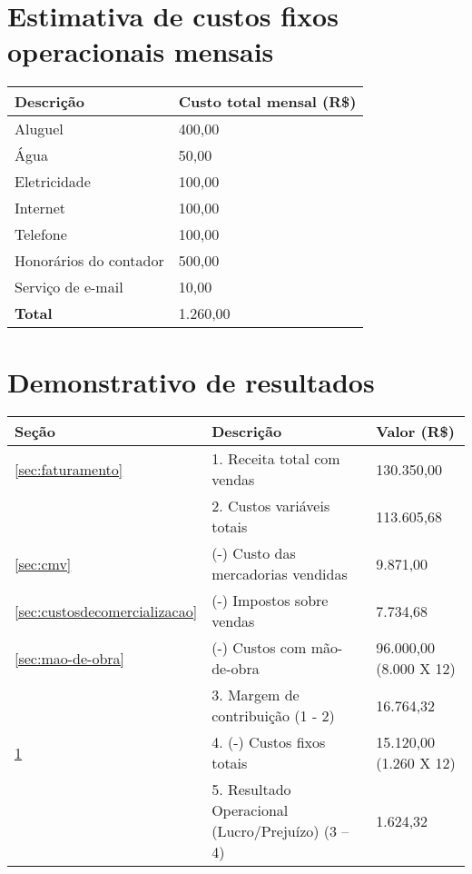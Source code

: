 \section{Estimativa de custos fixos operacionais mensais}\label{sec:custosfixos}

\begin{tabular}{| l | l |}
  \hline
  \textbf{Descrição} & \textbf{Custo total mensal (R\$)} \\ \hline
  Aluguel & 400,00 \\ \hline
  Água & 50,00 \\ \hline
  Eletricidade & 100,00 \\ \hline
  Internet & 100,00 \\ \hline
  Telefone & 100,00 \\ \hline
  Honorários do contador & 500,00 \\ \hline
  Serviço de e-mail & 10,00 \\ \hline
  \textbf{Total} & 1.260,00 \\ \hline
\end{tabular}

\section{Demonstrativo de resultados}
  
\begin{tabular}{| l | l | l |}
  \hline
  \textbf{Seção} & \textbf{Descrição} & \textbf{Valor (R\$)}\\ \hline
  \ref{sec:faturamento} & 1. Receita total com vendas & 130.350,00\\ \hline \hline
   & 2. Custos variáveis totais & 113.605,68\\ \hline
  \ref{sec:cmv} & (-) Custo das mercadorias vendidas & 9.871,00\\ \hline
  \ref{sec:custosdecomercializacao} & (-) Impostos sobre vendas & 7.734,68\\ \hline
  \ref{sec:mao-de-obra} & (-) Custos com mão-de-obra & 96.000,00 (8.000 X 12)\\ \hline \hline
   & 3. Margem de contribuição (1 - 2) & 16.764,32\\ \hline \hline
  \ref{sec:custosfixos} & 4. (-) Custos fixos totais & 15.120,00 (1.260 X 12)\\ \hline \hline 
   & 5. Resultado Operacional (Lucro/Prejuízo) (3 – 4) & 1.624,32\\ \hline
\end{tabular}
